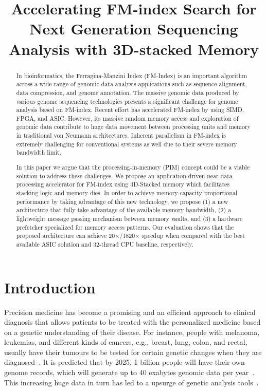 \documentclass[9pt,conference]{IEEEtran}
\begin{document}
\title{Accelerating FM-index Search for Next Generation Sequencing Analysis with 3D-stacked Memory}
\maketitle

\begin{abstract}
In bioinformatics, the Ferragina-Manzini Index (FM-Index) is an important algorithm across a wide range of genomic data analysis applications such as sequence alignment, data compression, and genome annotation. The massive genomic data produced by various genome sequencing technologies presents a significant challenge for genome analysis based on FM-index. 
Recent effort has accelerated FM-index by using SIMD, FPGA, and ASIC. However, its massive random memory access and exploration of genomic data contribute to huge data movement between processing units and memory in traditional von Neumann architectures.
Inherent parallelism in FM-index is extremely challenging for conventional systems as well due to their severe memory bandwidth limit.

In this paper we argue that the processing-in-memory (PIM) concept could be a viable solution to address these challenges.
We propose an application-driven near-data processing accelerator for FM-index using 3D-Stacked memory which facilitates stacking logic and memory dies. 
In order to achieve memory-capacity proportional performance by taking advantage of this new technology, we propose (1) a new architecture that fully take advantage of the available memory bandwidth, (2) a lightweight message passing mechanism between memory vaults, and (3) a hardware prefetcher specialized for memory access patterns. 
Our evaluation shows that the proposed architecture can achieve 20$\times$/1820$\times$ speedup when compared with the best available ASIC solution and 32-thread CPU baseline, respectively.
\end{abstract}

\section{Introduction}

Precision medicine has become a promising and an efficient approach to clinical diagnosis that allows patients to be treated with the personalized medicine based on a genetic understanding of their disease. For instance, people with melanoma, leukemias, and different kinds of cancers, e.g., breast, lung, colon, and rectal, usually have their tumours to be tested for certain genetic changes when they are  diagnosed~\cite{shendure2008next,chang2016smem,cong2017aim}. 
It is predicted that by 2025, 1 billion people will have their own genome records, which will generate up to 40 exabytes genomic data per year~\cite{stephens2015big}. 
This increasing huge data in turn has led to a upsurge of genetic analysis tools~\cite{}. 
\end{document}
